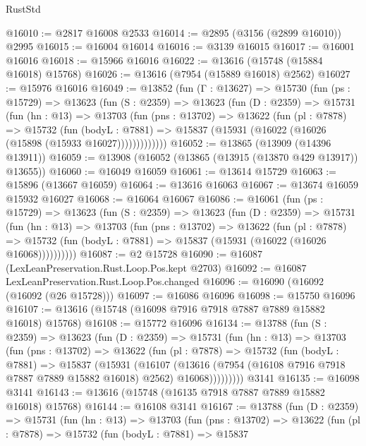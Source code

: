 \begin{lexlean}{RustStd}
\begin{coremodule}
@16010 := @2817 @16008 @2533
@16014 := @2895 (@3156 (@2899 @16010)) @2995
@16015 := @16004 @16014
@16016 := @3139 @16015
@16017 := @16001 @16016
@16018 := @15966 @16016
@16022 := @13616 (@15748 (@15884 @16018) @15768)
@16026 := @13616 (@7954 (@15889 @16018) @2562)
@16027 := @15976 @16016
@16049 := @13852
    (fun (Γ : @13627) =>
    @15730
      (fun (ps : @15729) =>
      @13623
        (fun (S : @2359) =>
        @13623
          (fun (D : @2359) =>
          @15731
            (fun (hn : @13) =>
            @13703
              (fun (pns : @13702) =>
              @13622
                (fun (pl : @7878) =>
                @15732
                  (fun (bodyL : @7881) =>
                  @15837 (@15931 (@16022 (@16026 (@15898 (@15933 @16027)))))))))))))
@16052 := @13865 (@13909 (@14396 @13911))
@16059 := @13908 (@16052 (@13865 (@13915 (@13870 @429 @13917)) @13655))
@16060 := @16049 @16059
@16061 := @13614 @15729
@16063 := @15896 (@13667 @16059)
@16064 := @13616 @16063
@16067 := @13674 @16059 @15932 @16027
@16068 := @16064 @16067
@16086 := @16061
    (fun (ps : @15729) =>
    @13623
      (fun (S : @2359) =>
      @13623
        (fun (D : @2359) =>
        @15731
          (fun (hn : @13) =>
          @13703
            (fun (pns : @13702) =>
            @13622
              (fun (pl : @7878) =>
              @15732 (fun (bodyL : @7881) => @15837 (@15931 (@16022 (@16026 @16068))))))))))
@16087 := @2 @15728
@16090 := @16087 (LexLeanPreservation.Rust.Loop.Pos.kept @2703)
@16092 := @16087 LexLeanPreservation.Rust.Loop.Pos.changed
@16096 := @16090 (@16092 (@16092 (@26 @15728)))
@16097 := @16086 @16096
@16098 := @15750 @16096
@16107 := @13616 (@15748 (@16098 @7916 @7918 @7887 @7889 @15882 @16018) @15768)
@16108 := @15772 @16096
@16134 := @13788
    (fun (S : @2359) =>
    @13623
      (fun (D : @2359) =>
      @15731
        (fun (hn : @13) =>
        @13703
          (fun (pns : @13702) =>
          @13622
            (fun (pl : @7878) =>
            @15732
              (fun (bodyL : @7881) =>
              @15837
                (@15931
                  (@16107
                    (@13616
                      (@7954 (@16108 @7916 @7918 @7887 @7889 @15882 @16018) @2562)
                      @16068)))))))))
    @3141
@16135 := @16098 @3141
@16143 := @13616 (@15748 (@16135 @7918 @7887 @7889 @15882 @16018) @15768)
@16144 := @16108 @3141
@16167 := @13788
    (fun (D : @2359) =>
    @15731
      (fun (hn : @13) =>
      @13703
        (fun (pns : @13702) =>
        @13622
          (fun (pl : @7878) =>
          @15732
            (fun (bodyL : @7881) =>
            @15837

\end{coremodule}
\end{lexlean}
